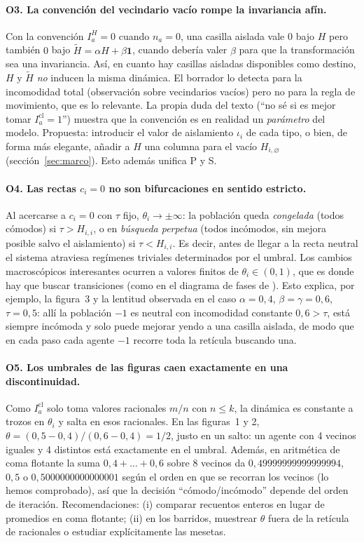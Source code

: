 \documentclass[11pt,a4paper]{article}
\theoremstyle{plain}
\theoremstyle{definition}
\theoremstyle{remark}
\newcommand{\vac}{\varnothing}
\newcommand{\one}{\mathbf{1}}
\newcommand{\Icl}{I^{\mathrm{cl}}}
\newcommand{\modP}{\textsf{P}}
\newcommand{\modS}{\textsf{S}}
\begin{document}
\paragraph{O3. La convención del vecindario vacío rompe la invariancia afín.}
Con la convención $I^H_a=0$ cuando $n_a=0$, una casilla aislada vale $0$ bajo
$H$ pero también $0$ bajo $\widetilde H=\alpha H+\beta\one$, cuando debería
valer $\beta$ para que la transformación sea una invariancia. Así, en cuanto hay
casillas aisladas disponibles como destino, $H$ y $\widetilde H$ \emph{no}
inducen la misma dinámica. El borrador lo detecta para la incomodidad total
(observación sobre vecindarios vacíos) pero no para la regla de movimiento, que
es lo relevante. La propia duda del texto (``no sé si es mejor tomar
$\Icl_a=1$'') muestra que la convención es en realidad un \emph{parámetro} del
modelo. Propuesta: introducir el valor de aislamiento $\iota_i$ de cada tipo, o
bien, de forma más elegante, añadir a $H$ una columna para el vacío $H_{i,\vac}$
(sección~\ref{sec:marco}). Esto además unifica \modP{} y \modS.

\paragraph{O4. Las rectas $c_i=0$ no son bifurcaciones en sentido estricto.}
Al acercarse a $c_i=0$ con $\tau$ fijo, $\theta_i\to\pm\infty$: la población
queda \emph{congelada} (todos cómodos) si $\tau>H_{i,i}$, o en \emph{búsqueda
perpetua} (todos incómodos, sin mejora posible salvo el aislamiento) si
$\tau<H_{i,i}$. Es decir, antes de llegar a la recta neutral el sistema atraviesa
regímenes triviales determinados por el umbral. Los cambios macroscópicos
interesantes ocurren a valores finitos de $\theta_i\in(0,1)$, que es donde hay
que buscar transiciones (como en el diagrama de fases de
\cite{Gauvin2009}). Esto explica, por ejemplo, la figura~3 y la lentitud
observada en el caso $\alpha=0{,}4$, $\beta=\gamma=0{,}6$, $\tau=0{,}5$: allí la
población $-1$ es neutral con incomodidad constante $0{,}6>\tau$, está siempre
incómoda y solo puede mejorar yendo a una casilla aislada, de modo que en cada
paso cada agente $-1$ recorre toda la retícula buscando una.

\paragraph{O5. Los umbrales de las figuras caen exactamente en una
discontinuidad.}
Como $\Icl_a$ solo toma valores racionales $m/n$ con $n\le k$, la dinámica es
constante a trozos en $\theta_i$ y salta en esos racionales. En las figuras~1 y
2, $\theta=(0{,}5-0{,}4)/(0{,}6-0{,}4)=1/2$, justo en un salto: un agente con
4 vecinos iguales y 4 distintos está exactamente en el umbral. Además, en
aritmética de coma flotante la suma $0{,}4+\dots+0{,}6$ sobre 8 vecinos da
$0{,}49999999999999994$, $0{,}5$ o $0{,}5000000000000001$ según el orden en que se
recorran los vecinos (lo hemos comprobado), así que la decisión ``cómodo/incómodo''
depende del orden de iteración. Recomendaciones: (i) comparar recuentos enteros
en lugar de promedios en coma flotante; (ii) en los barridos, muestrear
$\theta$ fuera de la retícula de racionales o estudiar explícitamente las
mesetas.
\end{document}
